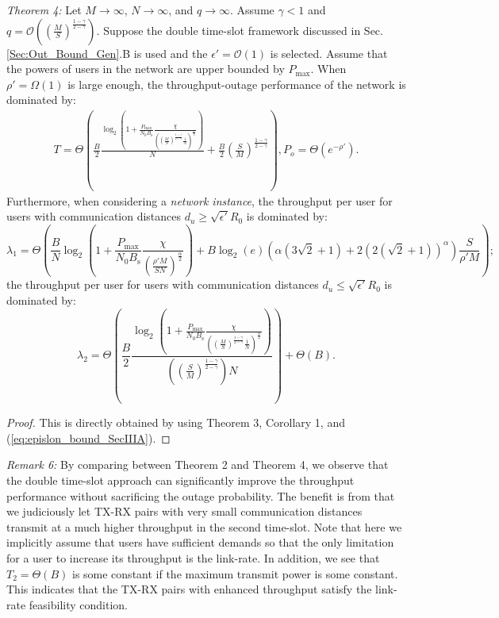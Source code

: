 \documentclass[journal,draftclsnofoot,onecolumn,12pt,twoside]{IEEEtran}
\begin{document}
{\em Theorem 4:} Let $M\to\infty$, $N\to\infty$, and $q\to\infty$. Assume $\gamma<1$ and $q=\mathcal{O}\left(\left(\frac{M}{S}\right)^{\frac{1-\gamma}{2-\gamma}}\right)$. Suppose the double time-slot framework discussed in Sec. \ref{Sec:Out_Bound_Gen}.B is used and the $\epsilon'=\mathcal{O}(1)$ is selected. Assume that the powers of users in the network are upper bounded by $P_{\text{max}}$. When $\rho'=\Omega(1)$ is large enough, the throughput-outage performance of the network is dominated by:
\begin{equation}
\begin{aligned}
T=\Theta\left(\frac{B}{2}\frac{\log_2\left(1+\frac{P_{\text{max}}}{N_0B_{\text{s}}}\frac{\chi}{\left(\left(\frac{M}{S}\right)^{\frac{1-\gamma}{2-\gamma}}\frac{1}{N}\right)^\frac{\alpha}{2}}\right)}{N}+\frac{B}{2}\left(\frac{S}{M}\right)^{\frac{1-\gamma}{2-\gamma}}\right),P_o= \Theta\left(e^{-\rho'}\right).
\end{aligned}
\end{equation}
Furthermore, when considering a {\em network instance}, the throughput per user for users with communication distances $d_u\geq \sqrt{\epsilon'}R_0$ is dominated by:
\begin{equation}
\lambda_1= \Theta\left(\frac{B}{N}\log_2\left(1+\frac{P_{\text{max}}}{N_0B_{\text{s}}}\frac{\chi}{\left(\frac{\rho'M}{SN}\right)^\frac{\alpha}{2}}\right)+B\log_2(e)\left(\alpha\left(3\sqrt{2}+1\right)+2(2(\sqrt{2}+1))^{\alpha}\right)\frac{S}{\rho'M}\right);
\end{equation}
the throughput per user for users with communication distances $d_u\leq\sqrt{\epsilon'}R_0$ is dominated by:
\begin{equation}
\lambda_2=\Theta\left(\frac{B}{2}\frac{\log_2\left(1+\frac{P_{\text{max}}}{N_0B_{\text{s}}}\frac{\chi}{\left(\left(\frac{M}{S}\right)^{\frac{1-\gamma}{2-\gamma}}\frac{1}{N}\right)^\frac{\alpha}{2}}\right)}{\left(\left(\frac{S}{M}\right)^{\frac{1-\gamma}{2-\gamma}}\right)N}\right)+\Theta(B).
\end{equation}
\begin{proof}
This is directly obtained by using Theorem 3, Corollary 1, and (\ref{eq:epislon_bound_SecIIIA}).
\end{proof}

{\em Remark 6:} By comparing between Theorem 2 and Theorem 4, we observe that the double time-slot approach can significantly improve the throughput performance without sacrificing the outage probability. The benefit is from that we judiciously let TX-RX pairs with very small communication distances transmit at a much higher throughput in the second time-slot. Note that here we implicitly assume that users have sufficient demands so that the only limitation for a user to increase its throughput is the link-rate. In addition, we see that $T_2=\Theta(B)$ is some constant if the maximum transmit power is some constant. This indicates that the TX-RX pairs with enhanced throughput satisfy the link-rate feasibility condition.
\end{document}
